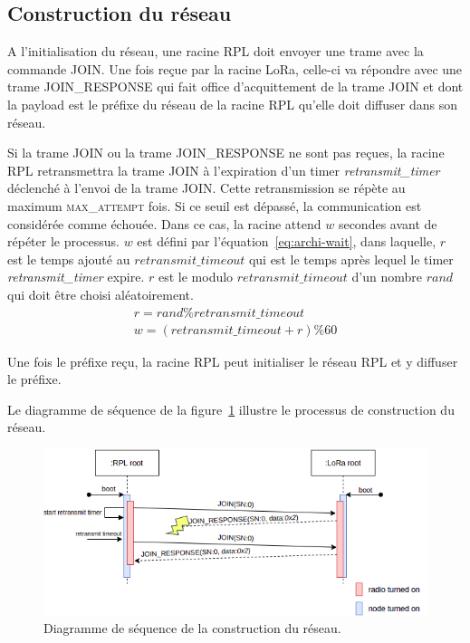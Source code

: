 \subsection*{Construction du réseau}%
    A l'initialisation du réseau, une racine RPL doit envoyer une trame avec la commande JOIN. Une 
    fois reçue par la racine LoRa, celle-ci va répondre avec une trame JOIN\_RESPONSE qui fait 
    office d'acquittement de la trame JOIN et dont la payload est le préfixe du réseau de la racine 
    RPL qu'elle doit diffuser dans son réseau.

    Si la trame JOIN ou la trame JOIN\_RESPONSE ne sont pas reçues, la racine RPL retransmettra la 
    trame JOIN à l'expiration d'un timer \textit{retransmit\_timer} déclenché à l'envoi de la trame 
    JOIN. Cette retransmission se répète au maximum \textsc{max\_attempt} fois. Si ce seuil est 
    dépassé, la communication est considérée comme échouée. Dans ce cas, la racine attend $w$ 
    secondes avant de répéter le processus. $w$ est défini par l'équation~\ref{eq:archi-wait}, 
    dans laquelle, $r$ est le temps ajouté au $retransmit\_timeout$ qui est le temps après lequel 
    le timer \textit{retransmit\_timer} expire. $r$ est le modulo $retransmit\_timeout$ d'un nombre 
    $rand$ qui doit être choisi aléatoirement.
    \begin{equation}\label{eq:archi-wait}
        \begin{split}
            r = rand \% retransmit\_timeout \\
            w = (retransmit\_timeout + r) \% 60
        \end{split}
    \end{equation}
    
    Une fois le préfixe reçu, la racine RPL peut initialiser le réseau RPL et y diffuser le préfixe.

    Le diagramme de séquence de la figure~\ref{fig:proto-seq-join} illustre le processus de construction du réseau.
    \begin{figure}[H]
        \centering
        \includegraphics[scale=0.6]{res/pictures/loramac-sequence-JOIN.drawio.png}
        \caption{Diagramme de séquence de la construction du réseau.}
        \label{fig:proto-seq-join}
    \end{figure}

